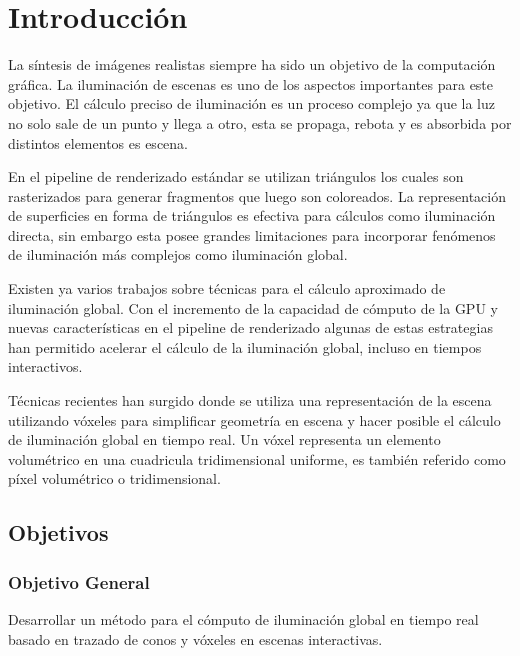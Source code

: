 \chapter*{Introducción}
\label{ch:intro}
La síntesis de imágenes realistas siempre ha sido un objetivo de la computación gráfica. La iluminación de escenas es uno de los aspectos importantes para este objetivo. El cálculo preciso de iluminación es un proceso complejo ya que la luz no solo sale de un punto y llega a otro, esta se propaga, rebota y es absorbida por distintos elementos es escena.

En el pipeline de renderizado estándar se utilizan triángulos los cuales son rasterizados para generar fragmentos que luego son coloreados. La representación de superficies en forma de triángulos es efectiva para cálculos como iluminación directa, sin embargo esta posee grandes limitaciones para incorporar fenómenos de iluminación más complejos como iluminación global.

Existen ya varios trabajos sobre técnicas para el cálculo aproximado de iluminación global. Con el incremento de la capacidad de cómputo de la \ac{GPU} y nuevas características en el pipeline de renderizado algunas de estas estrategias han permitido acelerar el cálculo de la iluminación global, incluso en tiempos interactivos.

Técnicas recientes han surgido donde se utiliza una representación de la escena utilizando vóxeles para simplificar geometría en escena y hacer posible el cálculo de iluminación global en tiempo real. Un vóxel representa un elemento volumétrico en una cuadricula tridimensional uniforme, es también referido como píxel volumétrico o tridimensional.

\section*{Objetivos} %
\label{sec:section_name}
\subsection*{Objetivo General} %
\label{sub:subsection_name}
Desarrollar un método para el cómputo de iluminación global en tiempo real basado en trazado de conos y vóxeles en escenas interactivas.
